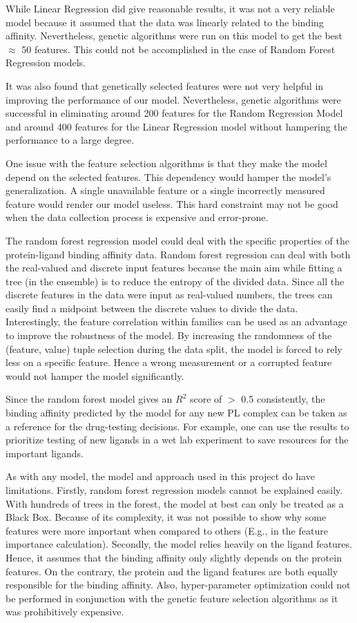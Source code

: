 \documentclass[11pt]{article}
\begin{document}
While Linear Regression did give reasonable results,  it was not a very reliable model because it assumed that the data was linearly related to the binding affinity.
Nevertheless,  genetic algorithms were run on this model to get the best $\approx$ 50 features.
This could not be accomplished in the case of Random Forest Regression models.

It was also found that genetically selected features were not very helpful in improving the performance of our model. Nevertheless, genetic algorithms were successful in eliminating around 200 features for the Random Regression Model and around 400 features for the Linear Regression model without hampering the performance to a large degree.

One issue with the feature selection algorithms is that they make the model depend on the selected features.
This dependency would hamper the model's generalization.
A single unavailable feature or a single incorrectly measured feature would render our model useless.
This hard constraint may not be good when the data collection process is expensive and error-prone.

The random forest regression model could deal with the specific properties of the protein-ligand binding affinity data.
Random forest regression can deal with both the real-valued and discrete input features because the main aim while fitting a tree (in the ensemble) is to reduce the entropy of the divided data.
Since all the discrete features in the data were input as real-valued numbers,  the trees can easily find a midpoint between the discrete values to divide the data. 
Interestingly, the feature correlation within families can be used as an advantage to improve the robustness of the model. 
By increasing the randomness of the (feature, value) tuple selection during the data split, the model is forced to rely less on a specific feature.
Hence a wrong measurement or a corrupted feature would not hamper the model significantly.

Since the random forest model gives an $R^2$ score of $>$ 0.5 consistently,  the binding affinity predicted by the model for any new PL complex can be taken as a reference for the drug-testing decisions.
For example,  one can use the results to prioritize testing of new ligands in a wet lab experiment to save resources for the important ligands.

As with any model,  the model and approach used in this project do have limitations. 
Firstly, random forest regression models cannot be explained easily.
With hundreds of trees in the forest, the model at best can only be treated as a Black Box.
Because of its complexity,  it was not possible to show why some features were more important when compared to others (E.g., in the feature importance calculation).
Secondly, the model relies heavily on the ligand features. 
Hence, it assumes that the binding affinity only slightly depends on the protein features. On the contrary, the protein and the ligand features are both equally responsible for the binding affinity.
Also,  hyper-parameter optimization could not be performed
in conjunction with the genetic feature selection algorithms as it was prohibitively expensive.
\end{document}
